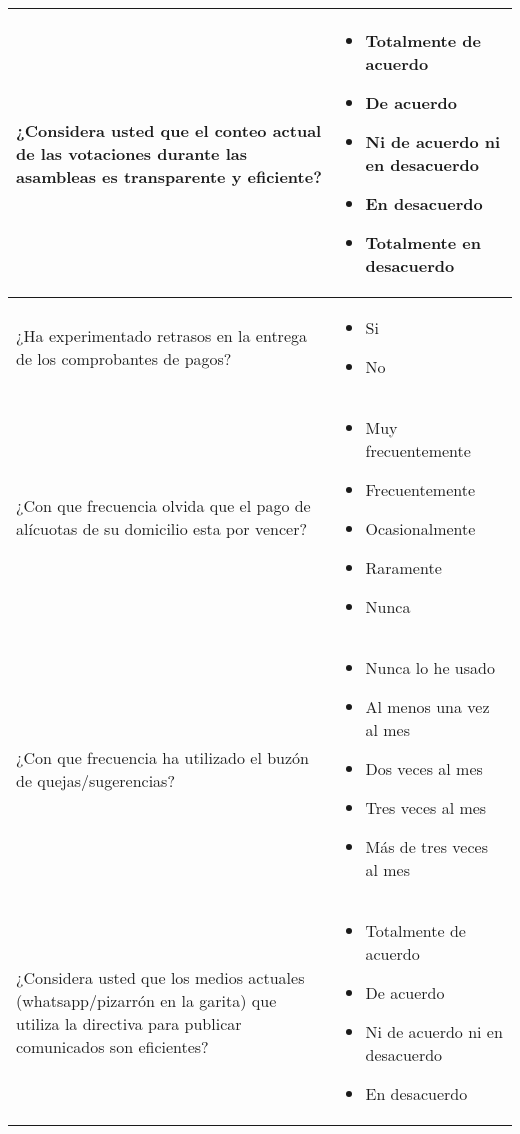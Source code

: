 \begin{center}
\begin{small}
\begin{longtable}[c]{|p{}|p{}|}
			\hline
			¿Considera usted que el conteo actual de las votaciones durante las asambleas es transparente y eficiente? &
			\begin{itemize}
				\item Totalmente de acuerdo
				\item De acuerdo
				\item Ni de acuerdo ni en desacuerdo
				\item En desacuerdo
				\item Totalmente en desacuerdo
			\end{itemize} \\
			\hline
			¿Ha experimentado retrasos en la entrega de los comprobantes de pagos? &
			\begin{itemize}
				\item Si
				\item No
			\end{itemize} \\
			\hline
			¿Con que frecuencia olvida que el pago de alícuotas de su domicilio esta por vencer? &
			\begin{itemize}
				\item Muy frecuentemente
				\item Frecuentemente
				\item Ocasionalmente
				\item Raramente
				\item Nunca
			\end{itemize}\\
			\hline
			¿Con que frecuencia ha utilizado el buzón de quejas/sugerencias? &
			\begin{itemize}
				\item Nunca lo he usado
				\item Al menos una vez al mes
				\item Dos veces al mes
				\item Tres veces al mes
				\item Más de tres veces al mes
			\end{itemize} \\
			\hline
			¿Considera usted que los medios actuales (whatsapp/pizarrón en la garita) que utiliza la directiva para publicar comunicados son eficientes? &
			\begin{itemize}
				\item Totalmente de acuerdo
				\item De acuerdo
				\item Ni de acuerdo ni en desacuerdo
				\item En desacuerdo

\end{itemize}
\end{longtable}
\end{small}
\end{center}
